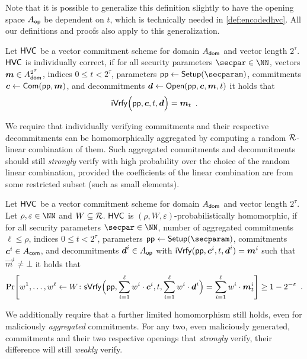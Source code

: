 Note that it is possible to generalize this definition slightly to have the opening space $A_{\mathsf{op}}$ be dependent on $t$, which is technically needed in \autoref{def:encodedhvc}.
All our definitions and proofs also apply to this generalization.
\begin{definition}
Let $\mathsf{HVC}$ be a vector commitment scheme for domain $A_{\mathsf{dom}}$ and vector length $2^\tau$.
  $\mathsf{HVC}$ is individually correct, if for all security parameters $\secpar\in\NN$, vectors $\boldsymbol{m}\in A_{\mathsf{dom}}^{2^\tau}$, indices $0\leq t < 2^\tau$, parameters $\params \gets \setup(\secparam)$, commitments $\boldsymbol{c} \gets \mathsf{Com}(\mathsf{pp},\boldsymbol{m})$, and decommitments $\boldsymbol{d} \gets \mathsf{Open}(\mathsf{pp},\boldsymbol{c},\boldsymbol{m},t)$ it holds that
  \[
    \mathsf{iVrfy}\Bigl(\mathsf{pp},\boldsymbol{c},t,\boldsymbol{d}\Bigr) = \boldsymbol{m}_{t}\enspace.
  \]
\end{definition}
%
We require that individually verifying commitments and their respective decommitments can be homomorphically aggregated by computing a random $\mathcal{R}$-linear combination of them.
Such aggregated commitments and decommitments should still \emph{strongly} verify with high probability over the choice of the random linear combination, provided the coefficients of the linear combination are from some restricted subset (such as small elements).

\begin{definition}
Let $\mathsf{HVC}$ be a vector commitment scheme for domain $A_{\mathsf{dom}}$ and vector length $2^\tau$. %
Let $\rho,\varepsilon\in\NN$ and $W\subseteq\mathcal{R}$.
$\mathsf{HVC}$ is $(\rho,W,\varepsilon)$-probabilistically homomorphic, if for all security parameters $\secpar\in\NN$, number of aggregated commitments $\ell \leq \rho$, indices $0\leq t < 2^\tau$, parameters $\params \gets \setup(\secparam)$, commitments $\boldsymbol{c}^i\in A_{\mathsf{com}}$, and decommitments $\boldsymbol{d}^i\in A_{\mathsf{op}}$ with $\mathsf{iVrfy}(\mathsf{pp},\boldsymbol{c}^i,t,\boldsymbol{d}^i) = \boldsymbol{m}^i$ such that $\vec{m}^i \neq \bot$ it holds that
  \[
    \Pr\mleft[
      w^1,\dots,w^{\ell} \gets W \colon
      \sverify\Bigl(\params,\sum_{i=1}^{\ell}w^i\cdot \vec{c}^i,t,\sum_{i=1}^{\ell}w^i\cdot \vec{d}^i\Bigr) = \sum_{i=1}^{\ell}w^i\cdot\vec{m}^i_{t}
    \mright] \geq 1-2^{-\varepsilon}\enspace.
  \]
\end{definition}
%
We additionally require that a further limited homomorphism still holds, even for maliciously \emph{aggregated} commitments.
For any two, even maliciously generated, commitments and their two respective openings that \emph{strongly} verify, their difference will still \emph{weakly} verify.


